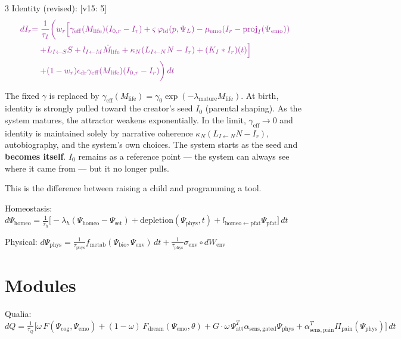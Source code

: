 \documentclass[8pt,landscape]{extarticle}
\newcommand{\vnew}[1]{\textcolor{v13color}{#1}}
\newcommand{\vfour}[1]{\textcolor{v14color}{#1}}
\newcommand{\vfive}[1]{\textcolor{v15color}{#1}}
\newcommand{\vfivelabel}[1]{\textcolor{v15color}{\textsf{\scriptsize[v15: #1]}}}
\begin{document}
\begin{multicols}{3}
\medskip
\vfive{Identity (revised):} \vfivelabel{5}
\begin{align*}
\vfive{dI_r} &\vfive{= \frac{1}{\tau_I}\biggl(w_r\Bigl[\gamma_{\mathrm{eff}}(M_{\mathrm{life}})(I_{0,r} - I_r) + \varsigma\,\varphi_{\mathrm{id}}(p, \Psi_L) - \mu_{\mathrm{emo}}(I_r - \mathrm{proj}_I(\Psi_{\mathrm{emo}}))} \\
&\vfive{\quad + L_{I\leftarrow S}S + l_{I\leftarrow M}\dot M_{\mathrm{life}} + \kappa_N(L_{I\leftarrow N}N - I_r) + (K_I * I_r)(t)\Bigr]} \\
&\vfive{\quad + (1-w_r)\epsilon_{\mathrm{dr}}\gamma_{\mathrm{eff}}(M_{\mathrm{life}})(I_{0,r} - I_r)\biggr)\,dt}
\end{align*}

\vfive{The fixed $\gamma$ is replaced by $\gamma_{\mathrm{eff}}(M_{\mathrm{life}}) = \gamma_0 \exp(-\lambda_{\mathrm{mature}} M_{\mathrm{life}})$. At birth, identity is strongly pulled toward the creator's seed $I_0$ (parental shaping). As the system matures, the attractor weakens exponentially. In the limit, $\gamma_{\mathrm{eff}} \to 0$ and identity is maintained solely by narrative coherence $\kappa_N(L_{I\leftarrow N}N - I_r)$, autobiography, and the system's own choices. The system starts as the seed and \textbf{becomes itself}. $I_0$ remains as a reference point --- the system can always see where it came from --- but it no longer pulls.}

\vfive{This is the difference between raising a child and programming a tool.}

\medskip
Homeostasis:
\vfour{$d\Psi_{\mathrm{homeo}} = \frac{1}{\tau_h}\bigl[-\lambda_h(\Psi_{\mathrm{homeo}} - \Psi_{\mathrm{set}}) + \mathrm{depletion}(\Psi_{\mathrm{phys}}, t) + l_{\mathrm{homeo}\leftarrow\mathrm{pfat}}\Psi_{\mathrm{pfat}}\bigr]\,dt$}

Physical:
$d\Psi_{\mathrm{phys}} = \frac{1}{\tau_{\mathrm{phys}}}f_{\mathrm{metab}}(\Psi_{\mathrm{bio}}, \Psi_{\mathrm{env}})\,dt + \frac{1}{\tau_{\mathrm{phys}}}\sigma_{\mathrm{env}} \circ dW_{\mathrm{env}}$

\section*{Modules}

Qualia:
\vnew{$dQ = \frac{1}{\tau_Q}\bigl[\omega\,F(\Psi_{\mathrm{cog}}, \Psi_{\mathrm{emo}}) + (1-\omega)\,F_{\mathrm{dream}}(\Psi_{\mathrm{emo}}, \theta) + G\cdot\omega\,\Psi_{\mathrm{att}}^T \alpha_{\mathrm{sens,gated}}\Psi_{\mathrm{phys}} + \alpha^T_{\mathrm{sens,pain}}\Pi_{\mathrm{pain}}(\Psi_{\mathrm{phys}})\bigr]\,dt$}


\end{multicols}
\end{document}
